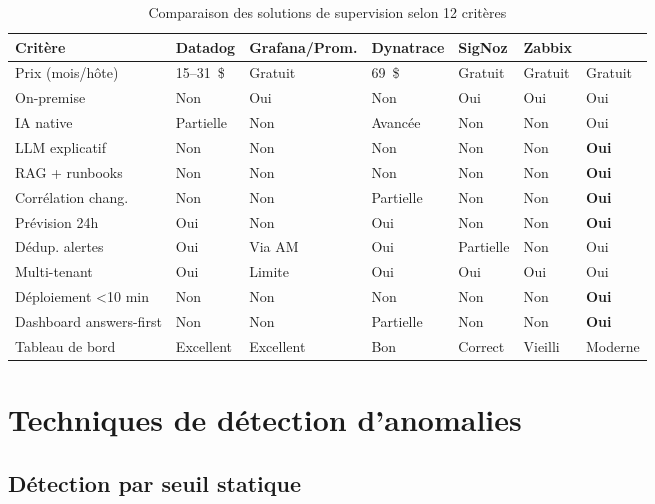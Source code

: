 \begin{table}[H]
\centering
\caption{Comparaison des solutions de supervision selon 12 critères}
\label{tab:comparaison-solutions}
\small
\begin{tabularx}{\textwidth}{lXXXXXX}
\toprule
\textbf{Critère} & \textbf{Datadog} & \textbf{Grafana/Prom.} & \textbf{Dynatrace}
  & \textbf{SigNoz} & \textbf{Zabbix} & \textbf{\caimp{}} \\
\midrule
Prix (mois/hôte)  & 15--31~\$ & Gratuit    & 69~\$    & Gratuit     & Gratuit    & Gratuit \\
On-premise        & Non        & Oui        & Non      & Oui         & Oui        & Oui \\
IA native         & Partielle  & Non        & Avancée  & Non         & Non        & Oui \\
LLM explicatif    & Non        & Non        & Non      & Non         & Non        & \textbf{Oui} \\
RAG + runbooks    & Non        & Non        & Non      & Non         & Non        & \textbf{Oui} \\
Corrélation chang.& Non        & Non        & Partielle& Non         & Non        & \textbf{Oui} \\
Prévision 24h     & Oui        & Non        & Oui      & Non         & Non        & \textbf{Oui} \\
Dédup. alertes    & Oui        & Via AM     & Oui      & Partielle   & Non        & Oui \\
Multi-tenant      & Oui        & Limite     & Oui      & Oui         & Oui        & Oui \\
Déploiement \textless 10 min & Non & Non   & Non      & Non         & Non        & \textbf{Oui} \\
Dashboard answers-first & Non & Non        & Partielle& Non         & Non        & \textbf{Oui} \\
Tableau de bord   & Excellent  & Excellent  & Bon      & Correct     & Vieilli    & Moderne \\
\bottomrule
\end{tabularx}
\end{table}

\section{Techniques de détection d'anomalies}

\subsection{Détection par seuil statique}

